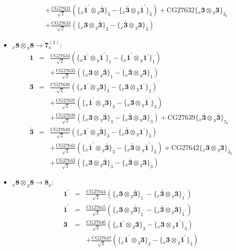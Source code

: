 \documentclass[english]{article}
\newcommand{\rep}[1]{\mathbf{#1}}
\newcommand{\repx}[2]{{}_{#2}\mathbf{#1}}
\newcommand{\subcg}[3]{\big\{ \repx{#1}{x}\otimes\repx{#2}{y}\big\}^{}_{#3}}
\begin{document}
\begin{itemize}
\begin{eqnarray*}
 & & +\frac{\text{CG27631}}{\sqrt{2}}\left(\subcg{\bar{1}^{\prime}}{\bar{3}}{\bar{3}}-\subcg{\bar{3}}{\bar{1}^{\prime}}{\bar{3}}\right)+\text{CG27632}\subcg{3}{3}{\bar{3}_{a}} \\ 
 & & +\frac{\text{CG27633}}{\sqrt{2}}\left(\subcg{3}{\bar{3}}{\bar{3}}-\subcg{\bar{3}}{3}{\bar{3}}\right)
\end{eqnarray*}
\item $\repx{8}{x}\otimes\repx{8}{y}\to\rep{7}_{a}^{(2)}$:
\begin{eqnarray*}
\rep{1} &=& \frac{\text{CG27634}}{\sqrt{2}}\left(\subcg{1^{\prime}}{\bar{1}^{\prime}}{1}-\subcg{\bar{1}^{\prime}}{1^{\prime}}{1}\right) \\ 
 & & +\frac{\text{CG27635}}{\sqrt{2}}\left(\subcg{3}{\bar{3}}{1}-\subcg{\bar{3}}{3}{1}\right)
\\
\rep{3} &=& \frac{\text{CG27636}}{\sqrt{2}}\left(\subcg{1^{\prime}}{3}{3}-\subcg{3}{1^{\prime}}{3}\right) \\ 
 & & +\frac{\text{CG27637}}{\sqrt{2}}\left(\subcg{\bar{1}^{\prime}}{3}{3}-\subcg{3}{\bar{1}^{\prime}}{3}\right) \\ 
 & & +\frac{\text{CG27638}}{\sqrt{2}}\left(\subcg{3}{\bar{3}}{3}-\subcg{\bar{3}}{3}{3}\right)+\text{CG27639}\subcg{\bar{3}}{\bar{3}}{3_{a}}
\\
\rep{\bar{3}} &=& \frac{\text{CG27640}}{\sqrt{2}}\left(\subcg{1^{\prime}}{\bar{3}}{\bar{3}}-\subcg{\bar{3}}{1^{\prime}}{\bar{3}}\right) \\ 
 & & +\frac{\text{CG27641}}{\sqrt{2}}\left(\subcg{\bar{1}^{\prime}}{\bar{3}}{\bar{3}}-\subcg{\bar{3}}{\bar{1}^{\prime}}{\bar{3}}\right)+\text{CG27642}\subcg{3}{3}{\bar{3}_{a}} \\ 
 & & +\frac{\text{CG27643}}{\sqrt{2}}\left(\subcg{3}{\bar{3}}{\bar{3}}-\subcg{\bar{3}}{3}{\bar{3}}\right)
\end{eqnarray*}
\item $\repx{8}{x}\otimes\repx{8}{y}\to\rep{8}_{a}$:
\begin{eqnarray*}
\rep{1^{\prime}} &=& \frac{\text{CG27644}}{\sqrt{2}}\left(\subcg{3}{\bar{3}}{1^{\prime}}-\subcg{\bar{3}}{3}{1^{\prime}}\right)
\\
\rep{\bar{1}^{\prime}} &=& \frac{\text{CG27645}}{\sqrt{2}}\left(\subcg{3}{\bar{3}}{\bar{1}^{\prime}}-\subcg{\bar{3}}{3}{\bar{1}^{\prime}}\right)
\\
\rep{3} &=& \frac{\text{CG27646}}{\sqrt{2}}\left(\subcg{1^{\prime}}{3}{3}-\subcg{3}{1^{\prime}}{3}\right) \\ 
 & & +\frac{\text{CG27647}}{\sqrt{2}}\left(\subcg{\bar{1}^{\prime}}{3}{3}-\subcg{3}{\bar{1}^{\prime}}{3}\right) \\ 

\end{eqnarray*}
\end{itemize}
\end{document}
